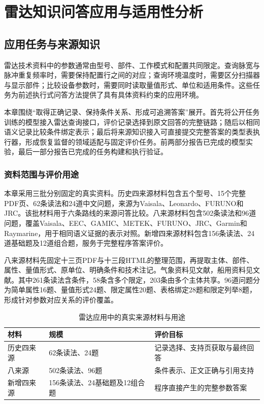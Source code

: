 \chapter{雷达知识问答应用与适用性分析}
\label{chap:radar-application}
\label{chap:radar-data}

\section{应用任务与来源知识}

雷达技术资料中的参数通常由型号、部件、工作模式和配置共同限定。查询脉宽与脉冲重复频率时，需要保持配置行之间的对应；查询环境温度时，需要区分扫描器与显示部件；比较设备参数时，需要同时读取量值形式、单位和适用条件。这些任务为前述执行式问答方法提供了具有具体资料约束的应用环境。

本章围绕“取得正确记录、保持条件关系、形成可追溯答案”展开。首先将公开任务训练的模型接入雷达查询接口，评价记录选择到原文回答的完整链路；随后以相同语义记录比较条件绑定表示；最后将来源知识接入可直接提交完整答案的类型表执行器，形成恢复监督的领域适配与固定评价任务。前两部分报告已完成的模型实验，最后一部分报告已完成的任务构建和执行验证。

\subsection{资料范围与评价用途}

本章采用三批分别固定的真实资料。历史四来源材料包含五个型号、15个完整PDF页、62条读法和24道中文问题，来源为Vaisala、Leonardo、FURUNO和JRC\cite{domain-vaisala,domain-leonardo,domain-furuno,domain-jrc}。该批材料用于六条路线的来源问答比较。八来源材料包含502条读法和96道问题，覆盖Vaisala、EEC、GAMIC、METEK、FURUNO、JRC、Garmin和Raymarine，用于相同语义证据的表示对照。新增四来源材料包含156条读法、24道基础题及12道组合题，服务于完整程序答案评价。

八来源材料先固定十三页PDF与十三段HTML的整理范围，再提取主体、部件、属性、量值形式、原单位、明确条件和技术注记。气象资料见文献\cite{source-v2-vaisala-wrs300,source-v2-eec-ranger,source-v2-gamic-gmwr,source-v2-metek-mrr2,source-v2-metek-mrrpro}，船用资料见文献\cite{source-v2-furuno-nxt,source-v2-jrc-5200,source-v2-garmin-fantom,source-v2-raymarine-cyclone}。其中261条读法含条件，58条含多个限定，203条由多个主体共享。96道问题分为简单属性16题、量值形式24题、限定属性20题、表格绑定28题和限定列举8题，形成针对参数对应关系的评价覆盖。

\begin{table}[htbp]
\centering\small
\caption{雷达应用中的真实来源材料与用途}
\label{tab:data-materials}
\begin{tabular}{p{2.5cm}p{4.0cm}p{6.0cm}}
\toprule
材料 & 规模 & 评价目标 \\
\midrule
历史四来源 & 62条读法、24题 & 记录选择、支持页获取与最终回答 \\
八来源 & 502条读法、96题 & 条件表示、正文正确与引用支持 \\
新增四来源 & 156条读法、24基础题及12组合题 & 程序直接产生的完整参数答案 \\
\bottomrule
\end{tabular}
\end{table}

